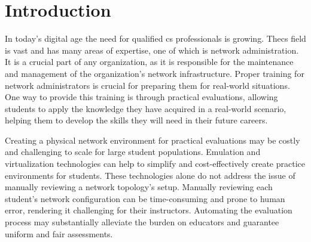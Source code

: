 
\chapter{Introduction}


\label{ChapterIntroduction}


In today's digital age the need for qualified \ac{cs} professionals is growing.
The\ac{cs} field is vast and has many areas of expertise, one of which is network administration.
It is a crucial part of any organization, as it is responsible for the maintenance and management of 
the organization's network infrastructure.
Proper training for network administrators is crucial for preparing them for real-world situations.
One way to provide this training is through practical evaluations, allowing students to apply the knowledge they 
have acquired in a real-world scenario, helping them to develop the skills they will need in their future careers.

Creating a physical network environment for practical evaluations may be costly and challenging to scale for 
large student populations. 
Emulation and virtualization technologies can help to simplify and cost-effectively create practice environments 
for students. 
These technologies alone do not address the issue of manually reviewing a network topology's setup. 
Manually reviewing each student's network configuration can be time-consuming and prone to human error, rendering 
it challenging for their instructors. Automating the evaluation process may substantially alleviate the burden 
on educators and guarantee uniform and fair assessments.



